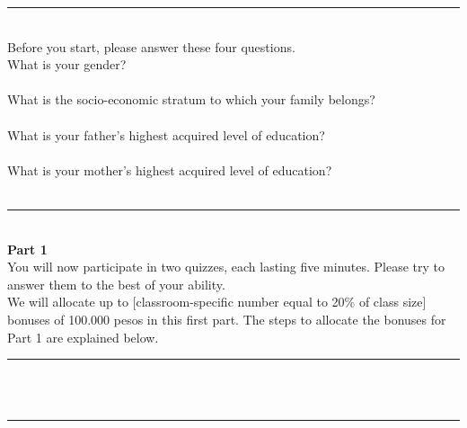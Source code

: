 \documentclass[11pt,a4paper,oneside]{article}
\begin{document}
\noindent\rule{\textwidth}{0.4pt}\\

\noindent Before you start, please answer these four questions. \\

\noindent What is your gender? \\ 

 \\

\noindent What is the socio-economic stratum to which your family belongs? \\

 \\

\noindent What is your father's highest acquired level of education?\\

 \\

\noindent What is your mother's highest acquired level of education?\\

 \\

\noindent\rule{\textwidth}{0.4pt}\\

\noindent \textbf{Part 1} \\

\noindent You will now participate in two quizzes, each lasting five minutes. Please try to answer them to the best of your ability. \\

\noindent We will allocate up to [classroom-specific number equal to 20\% of class size] bonuses of 100.000 pesos in this first part. The steps to allocate the bonuses for Part 1 are explained below.\\

\noindent\rule{\textwidth}{0.4pt}\\

 \\

\noindent\rule{\textwidth}{0.4pt}\\

 \\
\end{document}
